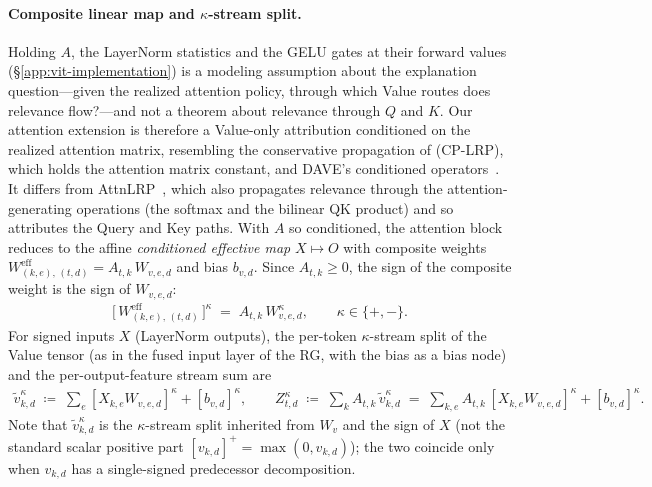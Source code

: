 \documentclass[twoside]{article}
\newif\ifch \chfalse
\newcommand{\ch}[1]{\ifch\textcolor{magenta}{#1}\else#1\fi}
\newcommand{\1}{\mathbf{1}}
\begin{document}
\paragraph{Composite linear map and $\kappa$-stream split.} Holding $A$, the LayerNorm statistics and the \acs{GELU} gates at their forward values
(\S\ref{app:vit-implementation}) is a modeling assumption about the explanation question---given
the realized attention policy, through which Value routes does relevance flow?---and not a theorem
about relevance through $Q$ and $K$. \ch{Our attention extension is therefore a Value-only attribution
conditioned on the realized attention matrix, resembling the conservative propagation of
\citet{Ali2022} (CP-LRP), which holds the attention matrix constant, and DAVE's conditioned
operators~\citep{Wrobel2024}. It differs from AttnLRP~\citep{achtibat2024attnlrp}, which also
propagates relevance through the attention-generating operations (the softmax and the bilinear QK
product) and so attributes the Query and Key paths.} With $A$ so conditioned, the attention block reduces to the
affine \emph{conditioned effective map} $X \mapsto O$ with composite weights
$W^{\mathrm{eff}}_{(k,e),\,(t,d)} = A_{t,k}\, W_{v,e,d}$ and bias $b_{v,d}$. Since $A_{t,k} \ge 0$,
the sign of the composite weight is the sign of $W_{v,e,d}$:
\begin{align}\label{eq:attn-composite-weight}
    \bigl[\,W^{\mathrm{eff}}_{(k,e),\,(t,d)}\,\bigr]^\kappa
    \;=\; A_{t,k}\, W_{v,e,d}^\kappa,
    \qquad \kappa \in \{+,-\}.
\end{align}
For signed inputs $X$ (LayerNorm outputs), the per-token $\kappa$-stream split of the Value tensor
(as in the fused input layer of the \ac{RG}, with the bias as a bias node) and the
per-output-feature stream sum are
\begin{align}\label{eq:attn-Z-def}
    \tilde{v}_{k,d}^\kappa \;\coloneqq\; \sum_e [X_{k,e} W_{v,e,d}]^\kappa + [b_{v,d}]^\kappa,
    \qquad
    Z_{t,d}^\kappa \;\coloneqq\; \sum_{k} A_{t,k}\, \tilde{v}_{k,d}^\kappa
    \;=\; \sum_{k,e} A_{t,k}\, [X_{k,e} W_{v,e,d}]^\kappa + [b_{v,d}]^\kappa.
\end{align}
Note that $\tilde{v}_{k,d}^\kappa$ is the $\kappa$-stream split inherited from $W_v$ and the sign
of $X$ (not the standard scalar positive part $[v_{k,d}]^+ = \max(0, v_{k,d})$); the two coincide
only when $v_{k,d}$ has a single-signed predecessor decomposition.
\end{document}
